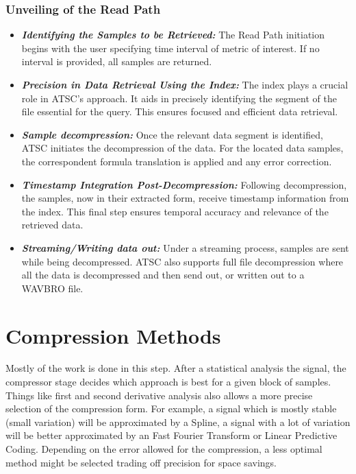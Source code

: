 \documentclass[conference]{IEEEtran}
\begin{document}
\subsubsection{Unveiling of the Read Path}\label{SCMC}
\begin{itemize}

\item{\textbf{\textit{Identifying the Samples to be Retrieved:}}} The Read Path initiation begins with the user specifying time interval of metric of interest. If no interval is provided, all samples are returned.

\vspace{5pt}
\item{\textbf{\textit{Precision in Data Retrieval Using the Index:}}} The index plays a crucial role in ATSC's approach. It aids in precisely identifying the segment of the file essential for the query. This ensures focused and efficient data retrieval.

\vspace{5pt}
\item{\textbf{\textit{Sample decompression:}}} Once the relevant data segment is identified, ATSC initiates the decompression of the data.
For the located data samples, the correspondent formula translation is applied and any error correction.

\vspace{5pt}
\item{\textbf{\textit{Timestamp Integration Post-Decompression:}}} Following decompression, the samples, now in their extracted form, receive timestamp information from the index. This final step ensures temporal accuracy and relevance of the retrieved data.

\vspace{5pt}
\item{\textbf{\textit{Streaming/Writing data out:}}} Under a streaming process, samples are sent while being decompressed. ATSC also supports full file decompression where all the data is decompressed and then send out, or written out to a WAVBRO file.
\end{itemize}

\section{Compression Methods}

Mostly of the work is done in this step. 
After a statistical analysis the signal, the compressor stage decides which approach is best for a given block of samples.
Things like first and second derivative analysis also allows a more precise selection of the compression form. 
For example, a signal which is mostly stable (small variation) will be approximated by a Spline, a signal with a lot of variation will be better approximated by an Fast Fourier Transform or Linear Predictive Coding.
Depending on the error allowed for the compression, a less optimal method might be selected trading off precision for space savings. 
\end{document}
